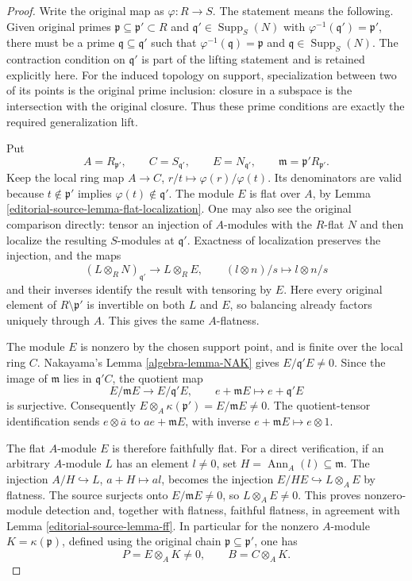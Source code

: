 \begin{proof}
Write the original map as $\varphi:R\to S$. The
statement means the following. Given original primes
$\mathfrak p\subseteq\mathfrak p'\subset R$ and
$\mathfrak q'\in\operatorname{Supp}_S(N)$ with
$\varphi^{-1}(\mathfrak q')=\mathfrak p'$, there
must be a prime $\mathfrak q\subseteq\mathfrak q'$
such that $\varphi^{-1}(\mathfrak q)=\mathfrak p$
and $\mathfrak q\in\operatorname{Supp}_S(N)$.
The contraction condition on $\mathfrak q'$ is
part of the lifting statement and is retained
explicitly here. For the induced topology on
support, specialization between two of its points
is the original prime inclusion: closure in a
subspace is the intersection with the original
closure. Thus these prime conditions are exactly
the required generalization lift.

Put
$$
A=R_{\mathfrak p'},\qquad C=S_{\mathfrak q'},
\qquad E=N_{\mathfrak q'},\qquad
\mathfrak m=\mathfrak p'R_{\mathfrak p'}.
$$
Keep the local ring map
$A\to C$, $r/t\mapsto\varphi(r)/\varphi(t)$.
Its denominators are valid because
$t\notin\mathfrak p'$ implies
$\varphi(t)\notin\mathfrak q'$.
The module $E$ is flat over $A$, by
Lemma \ref{editorial-source-lemma-flat-localization}. One may also
see the original comparison directly: tensor an
injection of $A$-modules with the $R$-flat $N$
and then localize the resulting $S$-modules at
$\mathfrak q'$. Exactness of localization preserves
the injection, and the maps
$$
(L\otimes_RN)_{\mathfrak q'}\longrightarrow L\otimes_RE,
\qquad (l\otimes n)/s\longmapsto l\otimes n/s
$$
and their inverses identify the result with
tensoring by $E$. Here every original element of
$R\setminus\mathfrak p'$ is invertible on both
$L$ and $E$, so balancing already factors uniquely
through $A$. This gives the same $A$-flatness.

The module $E$ is nonzero by the chosen support
point, and is finite over the local ring $C$.
Nakayama's Lemma \ref{algebra-lemma-NAK} gives
$E/\mathfrak q' E\ne0$. Since the image of
$\mathfrak m$ lies in $\mathfrak q'C$, the quotient
map
$$
E/\mathfrak mE\longrightarrow E/\mathfrak q'E,
\qquad e+\mathfrak mE\longmapsto e+\mathfrak q'E
$$
is surjective. Consequently
$E\otimes_A\kappa(\mathfrak p')=E/\mathfrak mE\ne0$.
The quotient-tensor identification sends
$e\otimes\overline a$ to $ae+\mathfrak mE$,
with inverse $e+\mathfrak mE\mapsto e\otimes1$.

The flat $A$-module $E$ is therefore faithfully
flat. For a direct verification, if an arbitrary
$A$-module $L$ has an element $l\ne0$, set
$H=\operatorname{Ann}_A(l)\subseteq\mathfrak m$.
The injection $A/H\hookrightarrow L$,
$a+H\mapsto al$, becomes the injection
$E/HE\hookrightarrow L\otimes_AE$ by flatness.
The source surjects onto $E/\mathfrak mE\ne0$,
so $L\otimes_AE\ne0$. This proves nonzero-module
detection and, together with flatness, faithful
flatness, in agreement with Lemma \ref{editorial-source-lemma-ff}.
In particular for the nonzero $A$-module
$K=\kappa(\mathfrak p)$, defined using the original
chain $\mathfrak p\subseteq\mathfrak p'$, one has
$$
P=E\otimes_AK\ne0,
\qquad B=C\otimes_AK.
$$


\end{proof}
